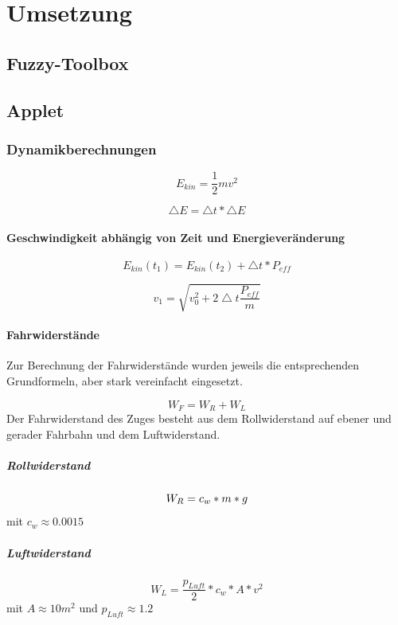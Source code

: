 \documentclass[10pt,a4paper]{article}
\begin{document}
\section{Umsetzung}

\subsection{Fuzzy-Toolbox}

\subsection{Applet}

\subsubsection{Dynamikberechnungen}
\begin{equation}
E_{kin} = \frac{1}{2} m v^{2} 
\end{equation}

\begin{equation}
\bigtriangleup E = \bigtriangleup t \ast \bigtriangleup E
\end{equation}

\paragraph{Geschwindigkeit abhängig von Zeit und Energieveränderung}
\begin{equation}
E_{kin}(t_{1}) = E_{kin}(t_{2}) + \bigtriangleup t \ast P_{eff}
\end{equation}

\begin{equation}
v_{1} = \sqrt{v_{0}^2 + 2 \bigtriangleup t \frac{P_{eff}}{m}}
\end{equation}

\paragraph{Fahrwiderstände}

Zur Berechnung der Fahrwiderstände wurden jeweils die entsprechenden Grundformeln, aber stark vereinfacht eingesetzt.

\begin{equation}
W_F = W_R + W_L
\end{equation}
Der Fahrwiderstand des Zuges besteht aus dem Rollwiderstand auf ebener und gerader Fahrbahn und dem Luftwiderstand.
\subparagraph{Rollwiderstand}
\begin{equation}
W_R = c_w \ast m * g \\
\end{equation}
mit $ c_w \approx 0.0015 $
\subparagraph{Luftwiderstand}
\begin{equation}
W_L = \frac{p_{Luft}}{2} * c_w * A * v^2
\end{equation}
mit $ A \approx 10 m^2 $ und $ p_{Luft} \approx 1.2 $
\end{document}
